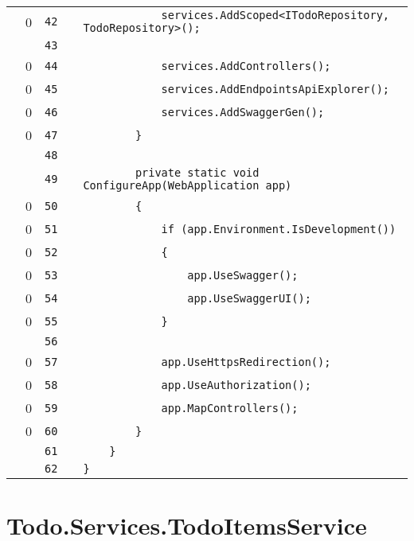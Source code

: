 \documentclass[a4paper,landscape,10pt]{article}
\begin{document}
\begin{longtable}[l]{lrrll}
\cellcolor{red} & 0 & \verb~42~ & & \verb~            services.AddScoped<ITodoRepository, TodoRepository>();~\\
\cellcolor{gray} &  & \verb~43~ & & \verb~~\\
\cellcolor{red} & 0 & \verb~44~ & & \verb~            services.AddControllers();~\\
\cellcolor{red} & 0 & \verb~45~ & & \verb~            services.AddEndpointsApiExplorer();~\\
\cellcolor{red} & 0 & \verb~46~ & & \verb~            services.AddSwaggerGen();~\\
\cellcolor{red} & 0 & \verb~47~ & & \verb~        }~\\
\cellcolor{gray} &  & \verb~48~ & & \verb~~\\
\cellcolor{gray} &  & \verb~49~ & & \verb~        private static void ConfigureApp(WebApplication app)~\\
\cellcolor{red} & 0 & \verb~50~ & & \verb~        {~\\
\cellcolor{red} & 0 & \verb~51~ & & \verb~            if (app.Environment.IsDevelopment())~\\
\cellcolor{red} & 0 & \verb~52~ & & \verb~            {~\\
\cellcolor{red} & 0 & \verb~53~ & & \verb~                app.UseSwagger();~\\
\cellcolor{red} & 0 & \verb~54~ & & \verb~                app.UseSwaggerUI();~\\
\cellcolor{red} & 0 & \verb~55~ & & \verb~            }~\\
\cellcolor{gray} &  & \verb~56~ & & \verb~~\\
\cellcolor{red} & 0 & \verb~57~ & & \verb~            app.UseHttpsRedirection();~\\
\cellcolor{red} & 0 & \verb~58~ & & \verb~            app.UseAuthorization();~\\
\cellcolor{red} & 0 & \verb~59~ & & \verb~            app.MapControllers();~\\
\cellcolor{red} & 0 & \verb~60~ & & \verb~        }~\\
\cellcolor{gray} &  & \verb~61~ & & \verb~    }~\\
\cellcolor{gray} &  & \verb~62~ & & \verb~}~\\
\end{longtable}
\newpage
\section{Todo.Services.TodoItemsService}
\end{document}
